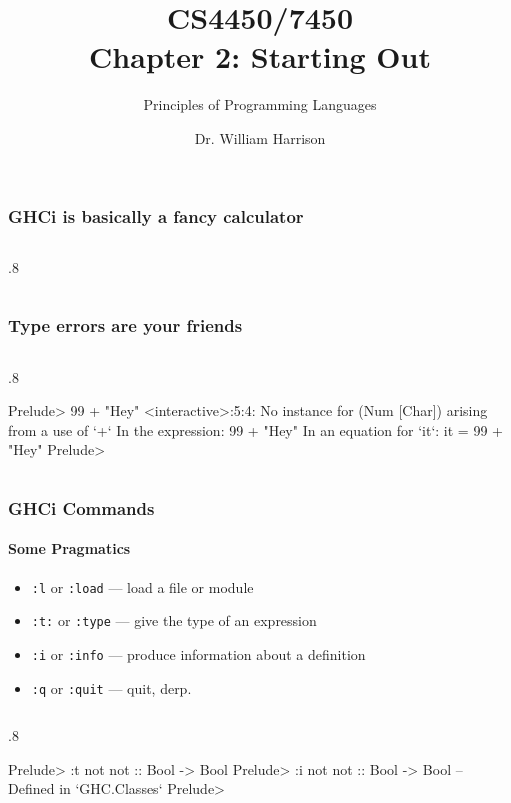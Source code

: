 \documentclass{beamer}
\title[CS4450]{CS4450/7450\\Chapter 2: Starting Out}
\subtitle{Principles of Programming Languages}
\author[Bill Harrison]{Dr. William Harrison}
\institute{University of Missouri}
\newenvironment{codeblock}[1][.8]{%
\begin{columns}
\begin{column}{#1\linewidth}
\begin{exampleblock}{}}{%
\end{exampleblock}
\end{column}
\end{columns}}
\begin{document}
\frame{\titlepage}

\begin{frame}[fragile]
\frametitle{GHCi is basically a fancy calculator}

\begin{codeblock}
\end{codeblock}
\end{frame}

\begin{frame}[fragile]
\frametitle{Type errors are your friends}
\begin{codeblock}
\begin{hcode}
Prelude> 99 + "Hey"
<interactive>:5:4:
    No instance for (Num [Char]) arising from a use of `+`
    In the expression: 99 + "Hey"
    In an equation for `it`: it = 99 + "Hey"
Prelude> 
\end{hcode}
\end{codeblock}

\end{frame}

\begin{frame}[fragile]
\frametitle{GHCi Commands}
\framesubtitle{Some Pragmatics}
\begin{itemize}
\item \verb+:l+ or \verb+:load+ --- load a file or module

\item \verb+:t:+ or \verb+:type+ --- give the type of an expression

\item \verb+:i+ or \verb+:info+ --- produce information about a definition

\item \verb+:q+ or \verb+:quit+ --- quit, derp.

\end{itemize}

\pause
\begin{codeblock}
\begin{hcode}
Prelude> :t not
not :: Bool -> Bool
Prelude> :i not
not :: Bool -> Bool 	
        -- Defined in `GHC.Classes`
Prelude> 
\end{hcode}
\end{codeblock}

\end{frame}
\end{document}
